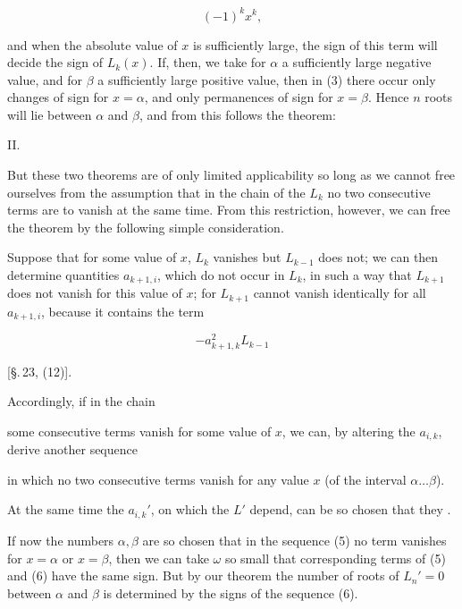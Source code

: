 \[
(-1)^k x^k,
\]

and when the absolute value of $x$ is sufficiently large, the sign of this term will decide the sign of $L_k(x)$. If, then, we take for $\alpha$ a sufficiently large negative value, and for $\beta$ a sufficiently large positive value, then in (3) there occur only changes of sign for $x=\alpha$, and only permanences of sign for $x=\beta$. Hence $n$ roots will lie between $\alpha$ and $\beta$, and from this follows the theorem:

II.\ 

But these two theorems are of only limited applicability so long as we cannot free ourselves from the assumption that in the chain of the $L_k$ no two consecutive terms are to vanish at the same time. From this restriction, however, we can free the theorem by the following simple consideration.

Suppose that for some value of $x$, $L_k$ vanishes but $L_{k-1}$ does not; we can then determine quantities $a_{k+1,i}$, which do not occur in $L_k$, in such a way that $L_{k+1}$ does not vanish for this value of $x$; for $L_{k+1}$ cannot vanish identically for all $a_{k+1,i}$, because it contains the term

\[
-a_{k+1,k}^2 L_{k-1}
\]

[\S.\,23, (12)].

Accordingly, if in the chain


some consecutive terms vanish for some value of $x$, we can, by altering the $a_{i,k}$, derive another sequence


in which no two consecutive terms vanish for any value $x$ (of the interval $\alpha \ldots \beta$).

At the same time the $a_{i,k}'$, on which the $L'$ depend, can be so chosen that they .

If now the numbers $\alpha, \beta$ are so chosen that in the sequence (5) no term vanishes for $x=\alpha$ or $x=\beta$, then we can take $\omega$ so small that corresponding terms of (5) and (6) have the same sign. But by our theorem the number of roots of $L_n'=0$ between $\alpha$ and $\beta$ is determined by the signs of the sequence (6).
